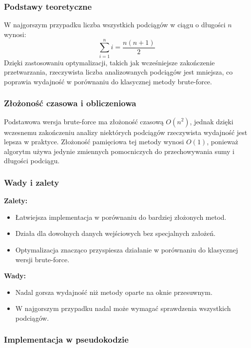 \documentclass[12pt,twoside]{article}
\begin{document}
\subsubsection{Podstawy teoretyczne}
W najgorszym przypadku liczba wszystkich podciągów w ciągu o długości $n$ wynosi:
\begin{equation}
    \sum_{i=1}^{n} i = \frac{n(n+1)}{2}
    \label{eq:suma_podciagow}
\end{equation}
Dzięki zastosowaniu optymalizacji, takich jak wcześniejsze zakończenie przetwarzania, rzeczywista liczba analizowanych podciągów jest mniejsza, co poprawia wydajność w porównaniu do klasycznej metody brute-force.

\subsubsection{Złożoność czasowa i obliczeniowa}
Podstawowa wersja brute-force ma złożoność czasową $O(n^2)$, jednak dzięki wczesnemu zakończeniu analizy niektórych podciągów rzeczywista wydajność jest lepsza w praktyce. Złożoność pamięciowa tej metody wynosi $O(1)$, ponieważ algorytm używa jedynie zmiennych pomocniczych do przechowywania sumy i długości podciągu.

\subsubsection{Wady i zalety}

\textbf{Zalety:}
\begin{itemize}
    \item Łatwiejsza implementacja w porównaniu do bardziej złożonych metod.
    \item Działa dla dowolnych danych wejściowych bez specjalnych założeń.
    \item Optymalizacja znacząco przyspiesza działanie w porównaniu do klasycznej wersji brute-force.
\end{itemize}

\textbf{Wady:}
\begin{itemize}
    \item Nadal gorsza wydajność niż metody oparte na oknie przesuwnym.
    \item W najgorszym przypadku nadal może wymagać sprawdzenia wszystkich podciągów.
\end{itemize}

\subsubsection{Implementacja w pseudokodzie}
\end{document}
